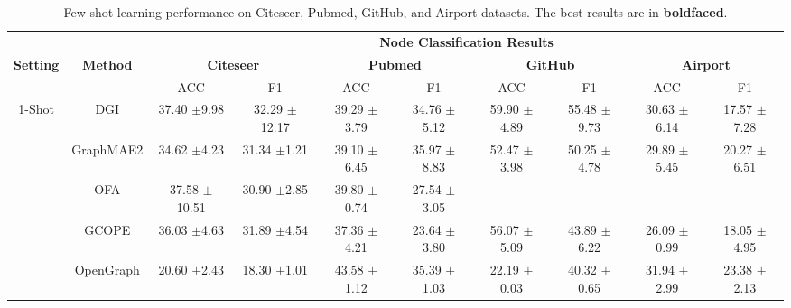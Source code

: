 \begin{table*}[ht]
    \caption{Few-shot learning performance on Citeseer, Pubmed, GitHub, and Airport datasets.  The best results are in \textbf{boldfaced}.}
    \vspace{-0.1in}
    \label{tab:fewshot_nc}
    \centering
    \begin{tabular}{c  c |cc cc cc cc}
    \hline
    & &\multicolumn{8}{c}{\textbf{Node Classification Results}}  \\ 
    \cline{3-10}
    \textbf{Setting} & \textbf{Method} & \multicolumn{2}{c}{\textbf{Citeseer}} &\multicolumn{2}{c}{\textbf{Pubmed}}  & \multicolumn{2}{c}{\textbf{GitHub}} & \multicolumn{2}{c}{\textbf{Airport}}  \\
    & &ACC & F1 & ACC & F1 & ACC & F1 & ACC & F1  \\
    \hline
    \multirow{7}{*}{1-Shot}
    & DGI \cite{iclr19dgi}
    & 37.40 {\scriptsize$\pm$9.98} & 32.29 {\scriptsize$\pm$12.17} & 39.29 {\scriptsize$\pm$3.79} & 34.76 {\scriptsize$\pm$5.12} & 59.90 {\scriptsize$\pm$4.89} & 55.48 {\scriptsize$\pm$9.73} & 30.63 {\scriptsize$\pm$6.14} & 17.57 {\scriptsize$\pm$7.28} \\
    & GraphMAE2 \cite{www23graphmae2}
    & 34.62 {\scriptsize$\pm$4.23} 
    & 31.34 {\scriptsize$\pm$1.21} 
    & 39.10 {\scriptsize$\pm$6.45} 
    & 35.97 {\scriptsize$\pm$8.83}
    & 52.47 {\scriptsize$\pm$3.98} 
    & 50.25 {\scriptsize$\pm$4.78} 
    & 29.89 {\scriptsize$\pm$5.45} 
    & 20.27 {\scriptsize$\pm$6.51} \\
    & OFA \cite{iclr24ofa}
    & 37.58 {\scriptsize$\pm$10.51} 
    & 30.90 {\scriptsize$\pm$2.85} 
    & 39.80 {\scriptsize$\pm$0.74}
    & 27.54 {\scriptsize$\pm$3.05}
    & -
    &- 
    &- 
    &- \\
    & GCOPE \cite{kdd24gcope}
    & 36.03 {\scriptsize$\pm$4.63} 
    & 31.89 {\scriptsize$\pm$4.54} 
    & 37.36 {\scriptsize$\pm$4.21} 
    & 23.64 {\scriptsize$\pm$3.80} 
    & 56.07 {\scriptsize$\pm$5.09} 
    & 43.89 {\scriptsize$\pm$6.22} 
    & 26.09 {\scriptsize$\pm$0.99} 
    & 18.05 {\scriptsize$\pm$4.95} \\
    & OpenGraph \cite{zhao2024graphany}
    & 20.60 {\scriptsize$\pm$2.43} & 18.30 {\scriptsize$\pm$1.01} & 43.58 {\scriptsize$\pm$1.12} & 35.39 {\scriptsize$\pm$1.03} & 22.19 {\scriptsize$\pm$0.03} & 40.32 {\scriptsize$\pm$0.65} & 31.94 {\scriptsize$\pm$2.99} & 23.38 {\scriptsize$\pm$2.13} \\

\end{tabular}
\end{table*}
